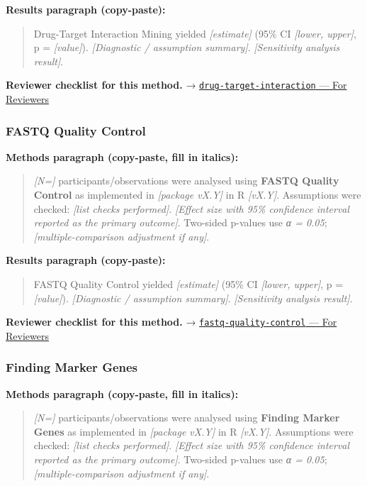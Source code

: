 \documentclass[
]{article}
\begin{document}
\textbf{Results paragraph (copy-paste):}

\begin{quote}
Drug-Target Interaction Mining yielded \emph{{[}estimate{]}} (95\% CI
\emph{{[}lower, upper{]}}, p = \emph{{[}value{]}}). \emph{{[}Diagnostic
/ assumption summary{]}}. \emph{{[}Sensitivity analysis result{]}}.
\end{quote}

\textbf{Reviewer checklist for this method.} →
\href{../chapters/12-bioinformatics/drug-target-interaction.Rmd\#for-reviewers}{\texttt{drug-target-interaction}
--- For Reviewers}

\subsubsection{FASTQ Quality Control}\label{fastq-quality-control}

\textbf{Methods paragraph (copy-paste, fill in italics):}

\begin{quote}
\emph{{[}N={]}} participants/observations were analysed using
\textbf{FASTQ Quality Control} as implemented in \emph{{[}package
vX.Y{]}} in R \emph{{[}vX.Y{]}}. Assumptions were checked: \emph{{[}list
checks performed{]}}. \emph{{[}Effect size with 95\% confidence interval
reported as the primary outcome{]}}. Two-sided p-values use \emph{α =
0.05}; \emph{{[}multiple-comparison adjustment if any{]}}.
\end{quote}

\textbf{Results paragraph (copy-paste):}

\begin{quote}
FASTQ Quality Control yielded \emph{{[}estimate{]}} (95\% CI
\emph{{[}lower, upper{]}}, p = \emph{{[}value{]}}). \emph{{[}Diagnostic
/ assumption summary{]}}. \emph{{[}Sensitivity analysis result{]}}.
\end{quote}

\textbf{Reviewer checklist for this method.} →
\href{../chapters/12-bioinformatics/fastq-quality-control.Rmd\#for-reviewers}{\texttt{fastq-quality-control}
--- For Reviewers}

\subsubsection{Finding Marker Genes}\label{finding-marker-genes}

\textbf{Methods paragraph (copy-paste, fill in italics):}

\begin{quote}
\emph{{[}N={]}} participants/observations were analysed using
\textbf{Finding Marker Genes} as implemented in \emph{{[}package
vX.Y{]}} in R \emph{{[}vX.Y{]}}. Assumptions were checked: \emph{{[}list
checks performed{]}}. \emph{{[}Effect size with 95\% confidence interval
reported as the primary outcome{]}}. Two-sided p-values use \emph{α =
0.05}; \emph{{[}multiple-comparison adjustment if any{]}}.
\end{quote}
\end{document}
